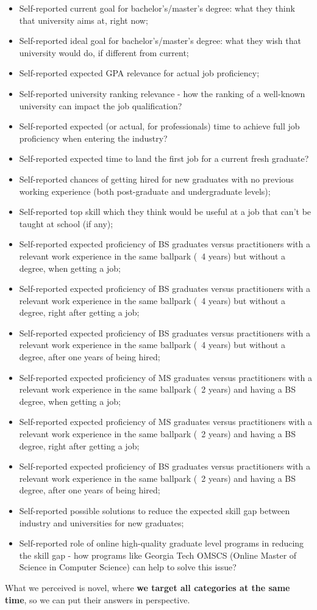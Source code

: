 \documentclass{sigchi}
\begin{document}
\begin{itemize}
	\item Self-reported current goal for bachelor's/master's degree: what they think that university aims at, right now;
	\item Self-reported ideal goal for bachelor's/master's degree: what they wish that university would do, if different from current;
	\item Self-reported expected GPA relevance for actual job proficiency;
	\item Self-reported university ranking relevance - how the ranking of a well-known university can impact the job qualification?
	\item Self-reported expected (or actual, for professionals) time to achieve full job proficiency when entering the industry?
	\item Self-reported expected time to land the first job for a current fresh graduate?
	\item Self-reported chances of getting hired for new graduates with no previous working experience (both post-graduate and undergraduate levels);
	\item Self-reported top skill which they think would be useful at a job that can't be taught at school (if any);
	\item Self-reported expected proficiency of BS graduates versus practitioners with a relevant work experience in the same ballpark (~4 years) but without a degree, when getting a job;
	\item Self-reported expected proficiency of BS graduates versus practitioners with a relevant work experience in the same ballpark (~4 years) but without a degree, right after getting a job;
	\item Self-reported expected proficiency of BS graduates versus practitioners with a relevant work experience in the same ballpark (~4 years) but without a degree, after one years of being hired;
	\item Self-reported expected proficiency of MS graduates versus practitioners with a relevant work experience in the same ballpark (~2 years) and having a BS degree, when getting a job;
	\item Self-reported expected proficiency of MS graduates versus practitioners with a relevant work experience in the same ballpark (~2 years) and having a BS degree, right after getting a job;
	\item Self-reported expected proficiency of BS graduates versus practitioners with a relevant work experience in the same ballpark (~2 years) and having a BS degree, after one years of being hired;
	\item Self-reported possible solutions to reduce the expected skill gap between industry and universities for new graduates; 
	\item Self-reported role of online high-quality graduate level programs in reducing the skill gap - how programs like Georgia Tech OMSCS (Online Master  of Science in Computer Science) can help to solve this issue?
\end{itemize}
 What we perceived is novel, where \textbf{we target all categories at the same time}, so we can put their answers in perspective.
\end{document}
